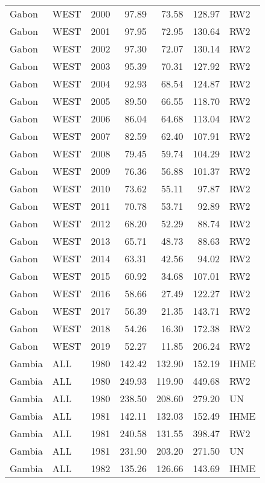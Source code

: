\begin{longtable}{lllrrrl}
  Gabon & WEST & 2000 & 97.89 & 73.58 & 128.97 & RW2 \\ 
  Gabon & WEST & 2001 & 97.95 & 72.95 & 130.64 & RW2 \\ 
  Gabon & WEST & 2002 & 97.30 & 72.07 & 130.14 & RW2 \\ 
  Gabon & WEST & 2003 & 95.39 & 70.31 & 127.92 & RW2 \\ 
  Gabon & WEST & 2004 & 92.93 & 68.54 & 124.87 & RW2 \\ 
  Gabon & WEST & 2005 & 89.50 & 66.55 & 118.70 & RW2 \\ 
  Gabon & WEST & 2006 & 86.04 & 64.68 & 113.04 & RW2 \\ 
  Gabon & WEST & 2007 & 82.59 & 62.40 & 107.91 & RW2 \\ 
  Gabon & WEST & 2008 & 79.45 & 59.74 & 104.29 & RW2 \\ 
  Gabon & WEST & 2009 & 76.36 & 56.88 & 101.37 & RW2 \\ 
  Gabon & WEST & 2010 & 73.62 & 55.11 & 97.87 & RW2 \\ 
  Gabon & WEST & 2011 & 70.78 & 53.71 & 92.89 & RW2 \\ 
  Gabon & WEST & 2012 & 68.20 & 52.29 & 88.74 & RW2 \\ 
  Gabon & WEST & 2013 & 65.71 & 48.73 & 88.63 & RW2 \\ 
  Gabon & WEST & 2014 & 63.31 & 42.56 & 94.02 & RW2 \\ 
  Gabon & WEST & 2015 & 60.92 & 34.68 & 107.01 & RW2 \\ 
  Gabon & WEST & 2016 & 58.66 & 27.49 & 122.27 & RW2 \\ 
  Gabon & WEST & 2017 & 56.39 & 21.35 & 143.71 & RW2 \\ 
  Gabon & WEST & 2018 & 54.26 & 16.30 & 172.38 & RW2 \\ 
  Gabon & WEST & 2019 & 52.27 & 11.85 & 206.24 & RW2 \\ 
  Gambia & ALL & 1980 & 142.42 & 132.90 & 152.19 & IHME \\ 
  Gambia & ALL & 1980 & 249.93 & 119.90 & 449.68 & RW2 \\ 
  Gambia & ALL & 1980 & 238.50 & 208.60 & 279.20 & UN \\ 
  Gambia & ALL & 1981 & 142.11 & 132.03 & 152.49 & IHME \\ 
  Gambia & ALL & 1981 & 240.58 & 131.55 & 398.47 & RW2 \\ 
  Gambia & ALL & 1981 & 231.90 & 203.20 & 271.50 & UN \\ 
  Gambia & ALL & 1982 & 135.26 & 126.66 & 143.69 & IHME \\ 

\end{longtable}
